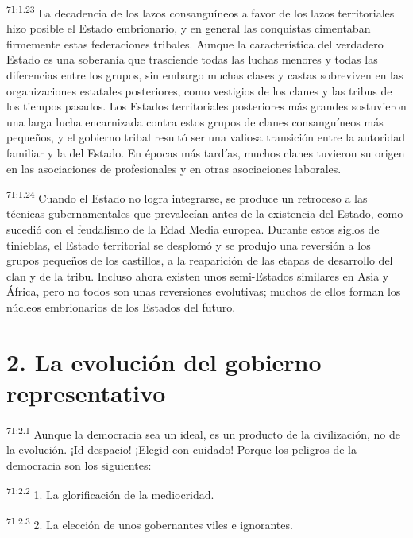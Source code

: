 \documentclass[twoside, 11pt]{book}
\begin{document}
\par
\textsuperscript{71:1.23} La decadencia de los lazos consanguíneos a favor de los lazos territoriales hizo posible el Estado embrionario, y en general las conquistas cimentaban firmemente estas federaciones tribales. Aunque la característica del verdadero Estado es una soberanía que trasciende todas las luchas menores y todas las diferencias entre los grupos, sin embargo muchas clases y castas sobreviven en las organizaciones estatales posteriores, como vestigios de los clanes y las tribus de los tiempos pasados. Los Estados territoriales posteriores más grandes sostuvieron una larga lucha encarnizada contra estos grupos de clanes consanguíneos más pequeños, y el gobierno tribal resultó ser una valiosa transición entre la autoridad familiar y la del Estado. En épocas más tardías, muchos clanes tuvieron su origen en las asociaciones de profesionales y en otras asociaciones laborales.

\par
\textsuperscript{71:1.24} Cuando el Estado no logra integrarse, se produce un retroceso a las técnicas gubernamentales que prevalecían antes de la existencia del Estado, como sucedió con el feudalismo de la Edad Media europea. Durante estos siglos de tinieblas, el Estado territorial se desplomó y se produjo una reversión a los grupos pequeños de los castillos, a la reaparición de las etapas de desarrollo del clan y de la tribu. Incluso ahora existen unos semi-Estados similares en Asia y África, pero no todos son unas reversiones evolutivas; muchos de ellos forman los núcleos embrionarios de los Estados del futuro.

\section*{2. La evolución del gobierno representativo}
\par
\textsuperscript{71:2.1} Aunque la democracia sea un ideal, es un producto de la civilización, no de la evolución. ¡Id despacio! ¡Elegid con cuidado! Porque los peligros de la democracia son los siguientes:

\par
\textsuperscript{71:2.2} 1. La glorificación de la mediocridad.

\par
\textsuperscript{71:2.3} 2. La elección de unos gobernantes viles e ignorantes.
\end{document}

